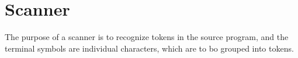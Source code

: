 \section{Scanner}
The purpose of a scanner is to recognize tokens in the source program, and the terminal symbols are individual characters, which are to bo grouped into tokens.\cite{misc:spo}\\

